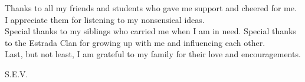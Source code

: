 Thanks to all my friends and students who gave me support and cheered for me. I appreciate them for listening to my nonsensical ideas. \\

Special thanks to my siblings who carried me when I am in need. Special thanks to the Estrada Clan for growing up with me and influencing each other. \\

Last, but not least, I am grateful to my family for their love and encouragements. \\

\begin{flushright}
S.E.V.
\end{flushright}

